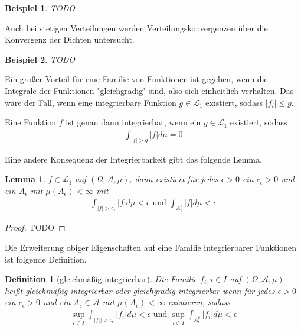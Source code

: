 \documentclass[]{article}
\newtheorem{lemma}{Lemma}
\newtheorem{definition}{Definition}
\newtheorem*{example}{Beispiel}
\begin{document}
\begin{example}
	TODO
\end{example}

Auch bei stetigen Verteilungen werden Verteilungskonvergenzen über die Konvergenz der Dichten untersucht.

\begin{example}
	TODO
\end{example}

Ein großer Vorteil für eine Familie von Funktionen ist gegeben, wenn die Integrale der Funktionen "gleichgradig" sind, also sich einheitlich verhalten. Das wäre der Fall, wenn eine integrierbare Funktion $g \in \mathcal{L}_1$ existiert, sodass $|f_i| \leq g$.

Eine Funktion $f$ ist genau dann integrierbar, wenn ein $g\in \mathcal{L}_1$ existiert, sodass
\begin{align*}
	\int_{|f|>g} |f| d\mu = 0
\end{align*}

Eine andere Konsequenz der Integrierbarkeit gibt das folgende Lemma.

\begin{lemma}
	$f\in\mathcal{L}_1$ auf $(\Omega, \mathcal{A}, \mu)$, dann existiert für jedes $\epsilon > 0$ ein $c_\epsilon > 0 $ und ein $A_\epsilon$ mit $\mu(A_\epsilon) < \infty$ mit
	\begin{align*}
		\int_{|f|>c_\epsilon} |f| d\mu < \epsilon \text{ und } \int_{A^c_\epsilon} |f| d\mu < \epsilon
	\end{align*}
\end{lemma}

\begin{proof}
	TODO
\end{proof}

Die Erweiterung obiger Eigenschaften auf eine Familie integrierbarer Funktionen ist folgende Definition.

\begin{definition}[gleichmäßig integrierbar]
	Die Familie ${f_i, i \in I}$ auf $(\Omega, \mathcal{A}, \mu)$ heißt gleichmäßig integrierbar oder gleichgradig integrierbar wenn für jedes $\epsilon > 0 $ ein $c_\epsilon > 0 $ und ein $A_\epsilon  \in \mathcal{A}$ mit $\mu(A_\epsilon) < \infty$ existieren, sodass
	\begin{align*}
		\sup_{i\in I} \int_{|f_i| > c_\epsilon} |f_i| d\mu < \epsilon \text{ und } \sup_{i\in I}\int_{A^c_\epsilon} |f_i| d\mu < \epsilon
	\end{align*}
\end{definition}
\end{document}
